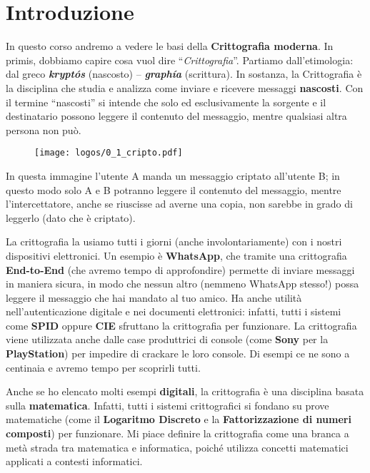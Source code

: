 \documentclass{report}
\begin{document}
\section{Introduzione}

In questo corso andremo a vedere le basi della \textbf{Crittografia moderna}. In primis, dobbiamo capire cosa vuol dire “\textit{Crittografia}”. Partiamo dall’etimologia: dal greco \textbf{\textit{kryptós}} (nascosto) – \textbf{\textit{graphía}} (scrittura). In sostanza, la Crittografia è la disciplina che studia e analizza come inviare e ricevere messaggi \textbf{nascosti}. Con il termine “nascosti” si intende che solo ed esclusivamente la sorgente e il destinatario possono leggere il contenuto del messaggio, mentre qualsiasi altra persona non può.

\begin{figure}[h]
     \centering
    \texttt{[image: logos/0\_1\_cripto.pdf]}
\end{figure}

In questa immagine l'utente A manda un messaggio criptato all’utente B; in questo modo solo A e B potranno leggere il contenuto del messaggio, mentre l’intercettatore, anche se riuscisse ad averne una copia, non sarebbe in grado di leggerlo (dato che è criptato).

La crittografia la usiamo tutti i giorni (anche involontariamente) con i nostri dispositivi elettronici. Un esempio è \textbf{WhatsApp}, che tramite una crittografia \textbf{End-to-End} (che avremo tempo di approfondire) permette di inviare messaggi in maniera sicura, in modo che nessun altro (nemmeno WhatsApp stesso!) possa leggere il messaggio che hai mandato al tuo amico. Ha anche utilità nell’autenticazione digitale e nei documenti elettronici: infatti, tutti i sistemi come \textbf{SPID} oppure \textbf{CIE} sfruttano la crittografia per funzionare. La crittografia viene utilizzata anche dalle case produttrici di console (come \textbf{Sony} per la \textbf{PlayStation}) per impedire di crackare le loro console. Di esempi ce ne sono a centinaia e avremo tempo per scoprirli tutti.


Anche se ho elencato molti esempi \textbf{digitali}, la crittografia è una disciplina basata sulla \textbf{matematica}. Infatti, tutti i sistemi crittografici si fondano su prove matematiche (come il \textbf{Logaritmo Discreto} e la \textbf{Fattorizzazione di numeri composti}) per funzionare. Mi piace definire la crittografia come una branca a metà strada tra matematica e informatica, poiché utilizza concetti matematici applicati a contesti informatici.
\end{document}
